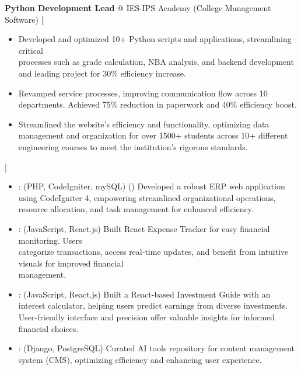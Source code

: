 \documentclass{resume}
\begin{document}
\begin{experiences}
    {\textbf{Python Development Lead} @ IES-IPS Academy (College Management Software)}%
    [\begin{itemize}
      \item Developed and optimized 10+ Python scripts and applications, streamlining critical \\processes such as grade calculation, NBA analysis, and backend development and leading project for 30\% efficiency increase.
      \item Revamped service processes, improving communication flow across 10 departments. Achieved 75\% reduction in paperwork and 40\% efficiency boost.
      \item Streamlined the website’s efficiency and functionality, optimizing data management and organization for over 1500+ students across 10+ different engineering courses to meet the institution’s rigorous standards.
    \end{itemize}]
\end{experiences}
\begin{itemize}
  \item {} \githubSymbol:
    (PHP, CodeIgniter, mySQL) ()
    Developed a robust ERP web application using CodeIgniter 4, empowering streamlined organizational operations, resource allocation, and task management for enhanced efficiency.
  \item {} \githubSymbol:
    (JavaScript, React.js) 
    Built React Expense Tracker for easy financial monitoring. Users \\categorize transactions, access real-time updates, and benefit from intuitive visuals for improved financial\\ management.
  \item {} \githubSymbol:
    (JavaScript, React.js)
    Built a React-based Investment Guide with an interest calculator, helping users predict earnings from diverse investments. User-friendly interface and precision offer valuable insights for informed financial choices.
  \item {} \githubSymbol:
    (Django, PostgreSQL)
    Curated AI tools repository for content management system (CMS), optimizing efficiency and enhancing user experience.
\end{itemize}
\end{document}
